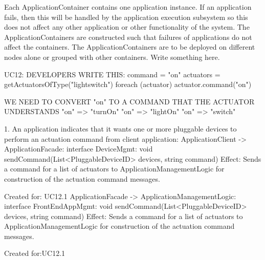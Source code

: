         Each ApplicationContainer contains one application instance. If an application fails,
        then this will be handled by the application execution subsystem so this
        does not affect any other application or other functionality of the system.
        The ApplicationContainers are constructed such that failures of applications
        do not affect the containers. The ApplicationContainers are to be deployed
        on different nodes alone or grouped with other containers. Write something here.




        UC12:
            DEVELOPERS WRITE THIS: command = "on"
            actuators = getActuatorsOfType("lightswitch")
            foreach (actuator) {
                actuator.command("on")
            }

            WE NEED TO CONVERT "on" TO A COMMAND THAT THE ACTUATOR UNDERSTANDS
            "on" => "turnOn"
            "on" => "lightOn"
            "on" => "switch"

            1. An application indicates that it wants one or more pluggable devices to perform an actuation command
                from client application:
                    ApplicationClient -> ApplicationFacade:           interface DeviceMgmt:       void sendCommand(List<PluggableDeviceID> devices, string command)
                        Effect: Sends a command for a list of actuators to ApplicationManagementLogic for construction of the actuation command messages.
                        \item Created for: UC12.1
                    ApplicationFacade -> ApplicationManagementLogic:  interface FrontEndAppMgmt:  void sendCommand(List<PluggableDeviceID> devices, string command)
                        Effect: Sends a command for a list of actuators to ApplicationManagementLogic for construction of the actuation command messages.
                        \item Created for:UC12.1

